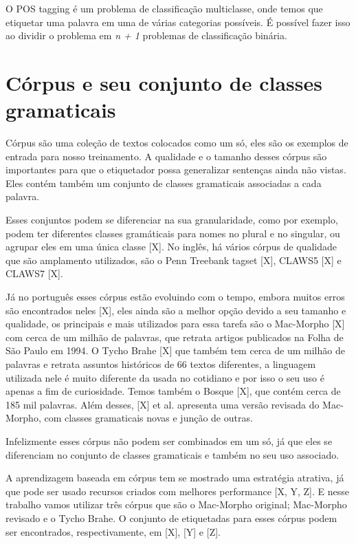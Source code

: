 O POS tagging é um problema de classificação multiclasse, onde temos que etiquetar uma palavra em uma de várias categorias possíveis. É possível fazer isso ao dividir o problema em \textit{n + 1} problemas de classificação binária.



\section{Córpus e seu conjunto de classes gramaticais}

Córpus são uma coleção de textos colocados como um só, eles são os exemplos de entrada para nosso treinamento. A qualidade e o tamanho desses córpus são importantes para que o etiquetador possa generalizar sentenças ainda não vistas. Eles contém também um conjunto de classes gramaticais associadas a cada palavra.

Esses conjuntos podem se diferenciar na sua granularidade, como por exemplo, podem ter diferentes classes gramáticais para nomes no plural e no singular, ou agrupar eles em uma única classe [X]. No inglês, há vários córpus de qualidade que são amplamento utilizados, são o Penn Treebank tagset [X], CLAWS5 [X] e CLAWS7 [X].

Já no português esses córpus estão evoluindo com o tempo, embora muitos erros são encontrados neles [X], eles ainda são a melhor opção devido a seu tamanho e qualidade, os principais e mais utilizados para essa tarefa são o Mac-Morpho [X] com cerca de um milhão de palavras, que retrata artigos publicados na Folha de São Paulo em 1994. O Tycho Brahe [X] que também tem cerca de um milhão de palavras e retrata assuntos históricos de 66 textos diferentes, a linguagem utilizada nele é muito diferente da usada no cotidiano e por isso o seu uso é apenas a fim de curiosidade. Temos também o Bosque [X], que contém cerca de 185 mil palavras. Além desses, [X] et al. apresenta uma versão revisada do Mac-Morpho, com classes gramaticais novas e junção de outras. 

Infelizmente esses córpus não podem ser combinados em um só, já que eles se diferenciam no conjunto de classes gramaticais e também no seu uso associado.

A aprendizagem baseada em córpus tem se mostrado uma estratégia atrativa, já que pode ser usado recursos criados com melhores performance [X, Y, Z]. E nesse trabalho vamos utilizar três córpus que são o Mac-Morpho original; Mac-Morpho revisado e o Tycho Brahe. O conjunto de etiquetadas para esses córpus podem ser encontrados, respectivamente, em [X], [Y] e [Z].


